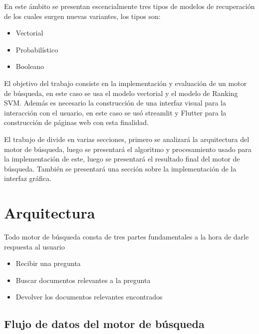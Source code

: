\documentclass[runningheads]{llncs}
\begin{document}
En este ámbito se presentan escencialmente tres tipos de modelos de recuperación de los
cuales surgen nuevas variantes, los tipos son:

\begin{itemize}
    \item Vectorial
    \item Probabilístico
    \item Booleano
\end{itemize}

El objetivo del trabajo consiste en la implementación y evaluación de un motor de búsqueda,
en este caso se usa el modelo vectorial y el modelo de Ranking SVM. Además es necesario la
construcción de una interfaz visual para la interacción con el usuario, en este caso se usó
streamlit y Flutter para la construcción de páginas web con esta finalidad.

El trabajo de divide en varias secciones, primero se analizará la arquitectura del motor de
búsqueda, luego se presentará el algoritmo y procesamiento usado para la implementación de 
este, luego se presentará el resultado final del motor de búsqueda. También se presentará una
sección sobre la implementación de la interfaz gráfica. 

\section{Arquitectura}

Todo motor de búsqueda consta de tres partes fundamentales a la hora de darle respuesta al usuario

\begin{itemize}
    \item Recibir una pregunta
    \item Buscar documentos relevantes a la pregunta
    \item Devolver los documentos relevantes encontrados
\end{itemize}

\subsection{Flujo de datos del motor de búsqueda}
\end{document}

